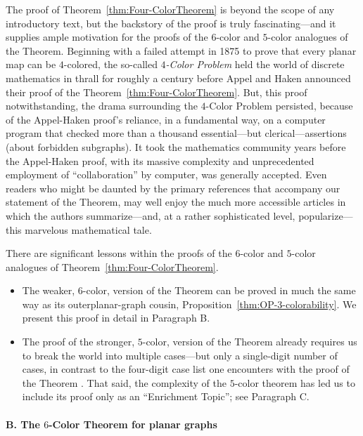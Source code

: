 The proof of Theorem~\ref{thm:Four-ColorTheorem} is beyond the scope
of any introductory text, but the backstory of the proof is truly fascinating---and it 
supplies ample motivation for the proofs of the $6$-color and $5$-color analogues
of the Theorem.  Beginning with a failed attempt in 1875 to prove that every planar
map can be $4$-colored, the so-called {\it $4$-Color Problem} held the world of discrete 
mathematics in thrall for roughly a century before Appel and Haken announced their proof of the Theorem~\ref{thm:Four-ColorTheorem}.  But, this proof notwithstanding,
the drama surrounding the $4$-Color Problem persisted,
because of the Appel-Haken proof's reliance, in a fundamental way, on
a computer program that checked more than a thousand essential---but
clerical---assertions (about forbidden subgraphs).  It took the
mathematics community years before the Appel-Haken proof, with its massive
complexity and unprecedented employment of ``collaboration'' by
computer, was generally accepted.  Even readers who might be daunted by the primary
references \cite{AppelH77a,AppelH77b} that accompany our statement of
the Theorem, may well enjoy the much more accessible articles \cite{AppelH77c,AppelH89}
in which the authors summarize---and, at a rather
sophisticated level, popularize---this marvelous mathematical tale.

\medskip

There are significant lessons within the proofs of the $6$-color and $5$-color
analogues of Theorem~\ref{thm:Four-ColorTheorem}.
\begin{itemize}
\item
The weaker, $6$-color, version of the Theorem can be proved in much the same way as its
outerplanar-graph cousin, Proposition~\ref{thm:OP-3-colorability}.  We
present this proof in detail in Paragraph B.  
\item
The proof of the stronger, $5$-color, version of the Theorem already requires us to break the
world into multiple cases---but only a single-digit number of cases, in contrast to the four-digit
case list one encounters with the proof of the Theorem \cite{AppelH77a,AppelH77b}.  That said,
the complexity of the $5$-color theorem has led us to include its
proof only as an ``Enrichment Topic''; see Paragraph C.
\end{itemize}

\medskip

\paragraph {B. The $6$-Color Theorem for planar graphs}

